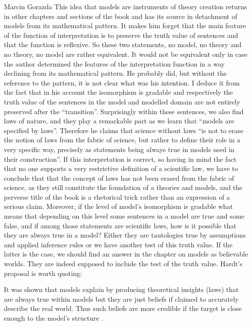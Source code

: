 \begin{recengenv}{Marcin Gorazda}
This idea that models are instruments of theory creation returns in other chapters and sections of the book and has its
source in detachment of models from its mathematical pattern. It makes him forget that the main feature of the function
of interpretation is to preserve the truth value of sentences and that the function is reflexive. So these two
statements, no model, no theory and no theory, no model are rather equivalent. It would not be equivalent only in case
the author determined the features of the interpretation function in a way declining from its mathematical pattern. He
probably did, but without the reference to the pattern, it is not clear what was his intention. I deduce it from the
fact that in his account the isomorphism is gradable and respectively the truth value of the sentences in the model and
modelled domain are not entirely preserved after the ``transition''. Surprisingly within these sentences, we also find
laws of nature, and they play a remarkable part as we learn that  ``models are specified by laws''.  Therefore he claims
that science without laws ``is not to erase the notion of laws from the fabric of science, but rather to define their
role in a very specific way, precisely as statements being always true in models used in their construction''.  If this
interpretation is correct, so having in mind the fact that no one supports a very restrictive definition of a
scientific law, we have to conclude that that the concept of laws has not been erased from the fabric of science, as
they still constitute the foundation of a theories and models, and the perverse title of the book is a rhetorical trick
rather than an expression of a serious claim. Moreover, if the level of model’s isomorphism is gradable what means that
depending on this level some sentences in a model are true and some false, and if among those statements are scientific
laws, how is it possible that they are always true in a model? Either they are tautologies true by assumptions and
applied inference rules or we have another test of this truth value. If the latter is the case, we should find an
answer in the chapter on models as believable worlds. They are indeed supposed to include the test of the truth value.
Hardt’s proposal is worth quoting:

\begin{myquoterev}
It was shown that models explain by producing theoretical insights (laws) that are always true within models but they
are just beliefs if claimed to accurately describe the real world. Thus such beliefs are more credible if the target is
close enough to the model’s structure
\parencite[p.161]{hardt_economics_2017}.
\end{myquoterev}


\end{recengenv}
